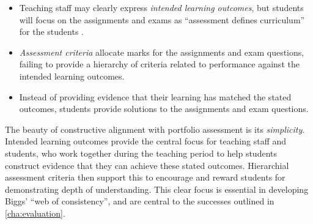\begin{itemize}[noitemsep,nolistsep]
	\item Teaching staff may clearly express \emph{intended learning outcomes}, but students will focus on the assignments and exams as ``assessment defines curriculum'' for the students \cite{Ramsden:1992}.
	\item \emph{Assessment criteria} allocate marks for the assignments and exam questions, failing to provide a hierarchy of criteria related to performance against the intended learning outcomes.
	\item Instead of providing evidence that their learning has matched the stated outcomes, students provide solutions to the assignments and exam questions. 
\end{itemize}



The beauty of constructive alignment with portfolio assessment is its \emph{simplicity}. Intended learning outcomes provide the central focus for teaching staff and students, who work together during the teaching period to help students construct evidence that they can achieve these stated outcomes. Hierarchial assessment criteria then support this to encourage and reward students for demonstrating depth of understanding. This clear focus is essential in developing Biggs' ``web of consistency'', and are central to the successes outlined in \cref{cha:evaluation}.

